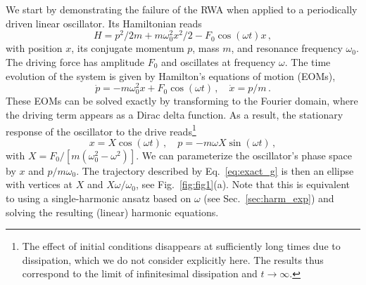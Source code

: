 We start by demonstrating the failure of the RWA when applied to a periodically driven linear oscillator. Its Hamiltonian reads
\begin{equation} \label{eq:qho}
H =p^2/2m+m\omega_0^2x^2/2-F_0\cos(\omega t) x\,,
\end{equation}
with position $x$, its conjugate momentum $p$, mass $m$, and resonance frequency $\omega_0$. The driving force has amplitude $F_0$ and oscillates at frequency $\omega$. The time evolution of the system is given by Hamilton's equations of motion (EOMs),
\begin{equation} \label{eq:sho}
\dot{p} = -m \omega_0^2 x + F_0 \cos(\omega t) \,, \quad \dot{x} = p / m \,.
\end{equation}
These EOMs can be solved exactly by transforming to the Fourier domain, where the driving term appears as a Dirac delta function. As a result, the stationary response of the oscillator to the drive reads\footnote{The effect of initial conditions disappears at sufficiently long times due to dissipation, which we do not consider explicitly here. The results thus correspond to the limit of infinitesimal dissipation and $t\rightarrow \infty$.}
\begin{equation} \label{eq:exact_g}
x = X \cos(\omega t) \,, \quad p = -m\omega X \sin(\omega t)\,,
\end{equation}
with $X =F_0/\left[m(\omega_0^2 - \omega^2)\right]$.
We can parameterize the oscillator's phase space by $x$ and $p/ m\omega_0$. The trajectory described by Eq.~\eqref{eq:exact_g} is then an ellipse with vertices at $X$ and $X \omega/\omega_0$, see Fig.~\ref{fig:fig1}(a). Note that this is equivalent to using a single-harmonic ansatz based on $\omega$ (see Sec.~\ref{sec:harm_exp}) and solving the resulting (linear) harmonic equations.

